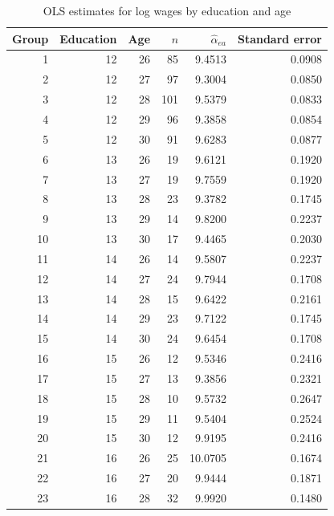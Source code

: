 \begin{table}[htbp]
    \centering
    \caption{OLS estimates for log wages by education and age}
    \label{tab:ps2-results}
    \small
    \setlength{\tabcolsep}{6pt}
    \begin{tabular}{@{}rrrrrr@{}}
        \toprule
        Group & Education & Age & $n$ & $\hat{\alpha}_{ea}$ & Standard error \\
        \midrule
        1  & 12 & 26 & 85  & 9.4513 & 0.0908 \\
        2  & 12 & 27 & 97  & 9.3004 & 0.0850 \\
        3  & 12 & 28 & 101 & 9.5379 & 0.0833 \\
        4  & 12 & 29 & 96  & 9.3858 & 0.0854 \\
        5  & 12 & 30 & 91  & 9.6283 & 0.0877 \\
        \midrule
        6  & 13 & 26 & 19  & 9.6121 & 0.1920 \\
        7  & 13 & 27 & 19  & 9.7559 & 0.1920 \\
        8  & 13 & 28 & 23  & 9.3782 & 0.1745 \\
        9  & 13 & 29 & 14  & 9.8200 & 0.2237 \\
        10 & 13 & 30 & 17  & 9.4465 & 0.2030 \\
        \midrule
        11 & 14 & 26 & 14  & 9.5807 & 0.2237 \\
        12 & 14 & 27 & 24  & 9.7944 & 0.1708 \\
        13 & 14 & 28 & 15  & 9.6422 & 0.2161 \\
        14 & 14 & 29 & 23  & 9.7122 & 0.1745 \\
        15 & 14 & 30 & 24  & 9.6454 & 0.1708 \\
        \midrule
        16 & 15 & 26 & 12  & 9.5346 & 0.2416 \\
        17 & 15 & 27 & 13  & 9.3856 & 0.2321 \\
        18 & 15 & 28 & 10  & 9.5732 & 0.2647 \\
        19 & 15 & 29 & 11  & 9.5404 & 0.2524 \\
        20 & 15 & 30 & 12  & 9.9195 & 0.2416 \\
        \midrule
        21 & 16 & 26 & 25  & 10.0705 & 0.1674 \\
        22 & 16 & 27 & 20  & 9.9444 & 0.1871 \\
        23 & 16 & 28 & 32  & 9.9920 & 0.1480 \\

\end{tabular}
\end{table}
